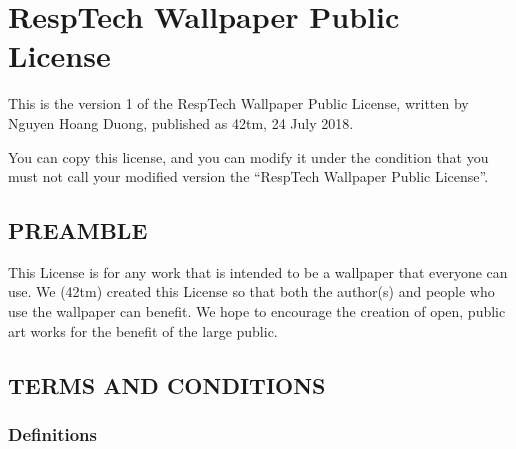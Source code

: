 \documentclass[]{article}
\date{}
\begin{document}
\hypertarget{resptech-wallpaper-public-license}{%
\section{RespTech Wallpaper Public
License}\label{resptech-wallpaper-public-license}}

This is the version 1 of the RespTech Wallpaper Public License, written
by Nguyen Hoang Duong, published as 42tm, 24 July 2018.

You can copy this license, and you can modify it under the condition
that you must not call your modified version the ``RespTech Wallpaper
Public License''.

\hypertarget{preamble}{%
\subsection{PREAMBLE}\label{preamble}}

This License is for any work that is intended to be a wallpaper that
everyone can use. We (42tm) created this License so that both the
author(s) and people who use the wallpaper can benefit. We hope to
encourage the creation of open, public art works for the benefit of the
large public.

\hypertarget{terms-and-conditions}{%
\subsection{TERMS AND CONDITIONS}\label{terms-and-conditions}}

\hypertarget{definitions}{%
\subsubsection{Definitions}\label{definitions}}
\end{document}
